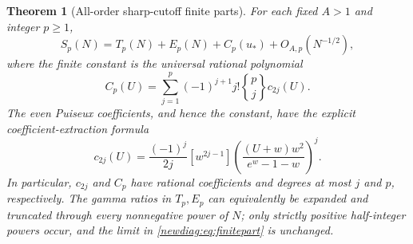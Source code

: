\documentclass[11pt,a4paper]{article}
\numberwithin{equation}{section}
\newtheorem{theorem}{Theorem}[section]
\theoremstyle{definition}
\theoremstyle{remark}
\begin{document}
\begin{theorem}[All-order sharp-cutoff finite parts]
\label{newdiag:thm:finiteparts}
For each fixed $A>1$ and integer $p\geq1$,
\begin{equation}\label{newdiag:eq:finitepart}
 S_p(N)=T_p(N)+E_p(N)+C_p(u_*)+O_{A,p}(N^{-1/2}),
\end{equation}
where the finite constant is the universal rational polynomial
\begin{equation}\label{newdiag:eq:Cp}
 C_p(U)=\sum_{j=1}^p(-1)^{j+1}j!
                 \genfrac{\{}{\}}{0pt}{}{p}{j}c_{2j}(U).
\end{equation}
The even Puiseux coefficients, and hence the constant, have the
explicit coefficient-extraction formula
\begin{equation}\label{newdiag:eq:even-coefficients}
 c_{2j}(U)=\frac{(-1)^j}{2j}[w^{2j-1}]
       \left(\frac{(U+w)w^2}{e^w-1-w}\right)^j.
\end{equation}
In particular, $c_{2j}$ and $C_p$ have rational coefficients and
degrees at most $j$ and $p$, respectively.  The gamma ratios in
$T_p,E_p$ can equivalently be expanded and truncated through every
nonnegative power of $N$; only strictly positive half-integer powers
occur, and the limit in \eqref{newdiag:eq:finitepart} is unchanged.
\end{theorem}
\end{document}
